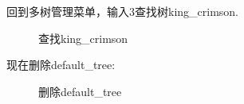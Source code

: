 \documentclass[supercite]{Experimental_Report}
\theoremstyle{definition}
\begin{document}
\noindent
回到多树管理菜单，输入3查找树king\_crimson.
\begin{figure}[htbp]
	\centering
	\centering
	\caption{查找king\_crimson}
	\label{fig5-92}
\end{figure}

\noindent
现在删除default\_tree:
\begin{figure}[htbp]
	\centering
	\centering
	\caption{删除default\_tree}
	\label{fig5-93}
\end{figure}
\end{document}
